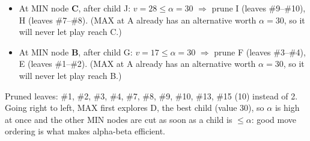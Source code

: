\documentclass[11pt,a4paper]{article}
\begin{document}
\begin{solbox}
\begin{itemize}[leftmargin=1.5em,itemsep=1pt]
\item At MIN node \textbf{C}, after child J: $v=28 \le \alpha=30$ $\Rightarrow$ prune I (leaves \#9--\#10), H (leaves \#7--\#8). (MAX at A already has an alternative worth $\alpha=30$, so it will never let play reach C.)
\item At MIN node \textbf{B}, after child G: $v=17 \le \alpha=30$ $\Rightarrow$ prune F (leaves \#3--\#4), E (leaves \#1--\#2). (MAX at A already has an alternative worth $\alpha=30$, so it will never let play reach B.)
\end{itemize}Pruned leaves: \#1, \#2, \#3, \#4, \#7, \#8, \#9, \#10, \#13, \#15 (10) instead of 2. Going right to left, MAX first explores D, the best child (value 30), so $\alpha$ is high at once and the other MIN nodes are cut as soon as a child is $\le\alpha$: good move ordering is what makes alpha-beta efficient.
\end{solbox}
\end{document}
